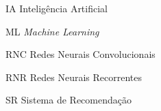 \begin{siglas}
  \item[IA] Inteligência Artificial
  \item[ML] \textit{Machine Learning}
  \item[RNC] Redes Neurais Convolucionais
  \item[RNR] Redes Neurais Recorrentes
  \item[SR] Sistema de Recomendação
\end{siglas}
